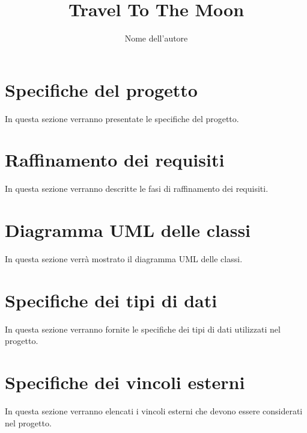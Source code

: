 \documentclass{article}
\title{Travel To The Moon}
\author{Nome dell'autore}
\date{}
\begin{document}
\maketitle

\section{Specifiche del progetto}

In questa sezione verranno presentate le specifiche del progetto.

\section{Raffinamento dei requisiti}

In questa sezione verranno descritte le fasi di raffinamento dei requisiti.

\section{Diagramma UML delle classi}

In questa sezione verrà mostrato il diagramma UML delle classi.

\section{Specifiche dei tipi di dati}

In questa sezione verranno fornite le specifiche dei tipi di dati utilizzati nel progetto.

\section{Specifiche dei vincoli esterni}

In questa sezione verranno elencati i vincoli esterni che devono essere considerati nel progetto.
\end{document}
